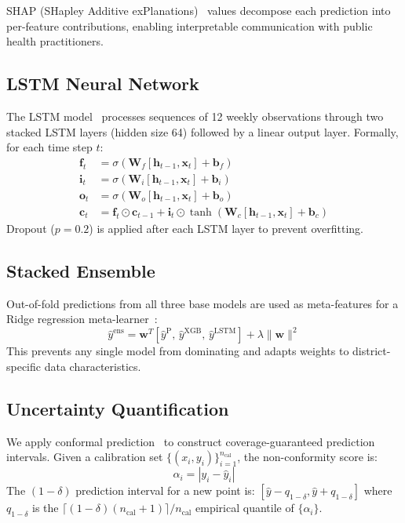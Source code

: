 \documentclass[conference]{IEEEtran}
\begin{document}
SHAP (SHapley Additive exPlanations)~\cite{lundberg2017shap} values decompose
each prediction into per-feature contributions, enabling interpretable
communication with public health practitioners.

\subsection{LSTM Neural Network}

The LSTM model~\cite{hochreiter1997lstm} processes sequences of 12 weekly
observations through two stacked LSTM layers (hidden size 64) followed by a
linear output layer. Formally, for each time step $t$:
\begin{align}
    \mathbf{f}_t &= \sigma(\mathbf{W}_f[\mathbf{h}_{t-1}, \mathbf{x}_t] + \mathbf{b}_f) \\
    \mathbf{i}_t &= \sigma(\mathbf{W}_i[\mathbf{h}_{t-1}, \mathbf{x}_t] + \mathbf{b}_i) \\
    \mathbf{o}_t &= \sigma(\mathbf{W}_o[\mathbf{h}_{t-1}, \mathbf{x}_t] + \mathbf{b}_o) \\
    \mathbf{c}_t &= \mathbf{f}_t \odot \mathbf{c}_{t-1} + \mathbf{i}_t \odot \tanh(\mathbf{W}_c[\mathbf{h}_{t-1}, \mathbf{x}_t] + \mathbf{b}_c)
    \label{eq:lstm}
\end{align}
Dropout ($p=0.2$) is applied after each LSTM layer to prevent overfitting.

\subsection{Stacked Ensemble}

Out-of-fold predictions from all three base models are used as meta-features
for a Ridge regression meta-learner~\cite{wolpert1992stacked}:
\begin{equation}
    \hat{y}^{\text{ens}} = \mathbf{w}^T [\hat{y}^{\text{P}},\, \hat{y}^{\text{XGB}},\, \hat{y}^{\text{LSTM}}]
    + \lambda \|\mathbf{w}\|^2
    \label{eq:ensemble}
\end{equation}
This prevents any single model from dominating and adapts weights to
district-specific data characteristics.

\subsection{Uncertainty Quantification}

We apply conformal prediction~\cite{angelopoulos2023conformal} to construct
coverage-guaranteed prediction intervals. Given a calibration set
$\{(x_i, y_i)\}_{i=1}^{n_{\text{cal}}}$, the non-conformity score is:
\begin{equation}
    \alpha_i = |y_i - \hat{y}_i|
    \label{eq:conformal}
\end{equation}
The $(1-\delta)$ prediction interval for a new point is:
$[\hat{y} - q_{1-\delta}, \hat{y} + q_{1-\delta}]$
where $q_{1-\delta}$ is the $\lceil(1-\delta)(n_{\text{cal}}+1)\rceil/n_{\text{cal}}$
empirical quantile of $\{\alpha_i\}$.
\end{document}
